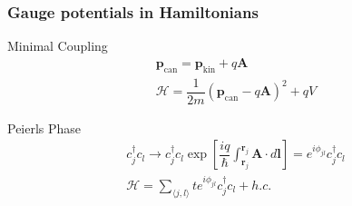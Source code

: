 \documentclass[xcolor=dvipsnames,10pt,aspectratio=169]{beamer}
\renewcommand{\vec}[1]{\mathbf{#1}}
\newcommand{\ham}{\mathcal{H}}
\newcommand{\cc}{c^{\dagger}}
\begin{document}
  \begin{frame}
  \frametitle{Gauge potentials in Hamiltonians}

  \centering Minimal Coupling
  \begin{gather}
    \vec{p}_{\text{can}} = \vec{p}_{\text{kin}} + q\vec{A} \\
    \ham = \dfrac{1}{2m} {\left( \vec{p}_{\text{can}} - q\vec{A} \right)}^2 + qV
  \end{gather}
  \vspace{1em}

  \centering Peierls Phase
  \begin{gather}
    \cc_j c_l \rightarrow \cc_j c_l \exp{\left[ \dfrac{iq}{\hbar} \int_{\vec{r}_j}^{\vec{r}_j} \vec{A}\cdot d\vec{l} \right]} = e^{i\phi_{jl}} \cc_j c_l \\
    \ham = \sum_{\langle j, l \rangle} t e^{i\phi_{jl}} \cc_j c_l + h.c.
  \end{gather}


  \end{frame}
\end{document}
